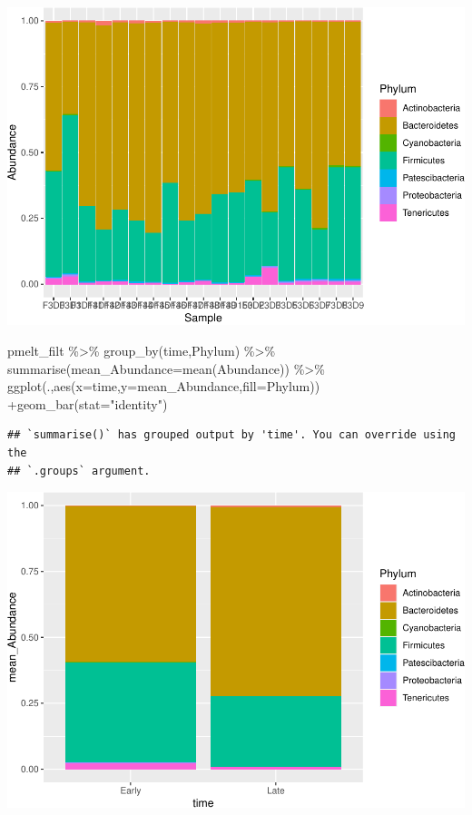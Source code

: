 \documentclass[
]{book}
\newenvironment{Shaded}{\begin{snugshade}}{\end{snugshade}}
\newcommand{\AttributeTok}[1]{\textcolor[rgb]{0.77,0.63,0.00}{#1}}
\newcommand{\FunctionTok}[1]{\textcolor[rgb]{0.00,0.00,0.00}{#1}}
\newcommand{\NormalTok}[1]{#1}
\newcommand{\SpecialCharTok}[1]{\textcolor[rgb]{0.00,0.00,0.00}{#1}}
\newcommand{\StringTok}[1]{\textcolor[rgb]{0.31,0.60,0.02}{#1}}
\begin{document}
\includegraphics{16sworkshop_files/figure-latex/unnamed-chunk-2-1.pdf}

\begin{Shaded}
\begin{Highlighting}[]
\NormalTok{pmelt\_filt }\SpecialCharTok{\%\textgreater{}\%} \FunctionTok{group\_by}\NormalTok{(time,Phylum) }\SpecialCharTok{\%\textgreater{}\%} \FunctionTok{summarise}\NormalTok{(}\AttributeTok{mean\_Abundance=}\FunctionTok{mean}\NormalTok{(Abundance)) }\SpecialCharTok{\%\textgreater{}\%} \FunctionTok{ggplot}\NormalTok{(.,}\FunctionTok{aes}\NormalTok{(}\AttributeTok{x=}\NormalTok{time,}\AttributeTok{y=}\NormalTok{mean\_Abundance,}\AttributeTok{fill=}\NormalTok{Phylum)) }\SpecialCharTok{+}\FunctionTok{geom\_bar}\NormalTok{(}\AttributeTok{stat=}\StringTok{"identity"}\NormalTok{)}
\end{Highlighting}
\end{Shaded}

\begin{verbatim}
## `summarise()` has grouped output by 'time'. You can override using the
## `.groups` argument.
\end{verbatim}

\includegraphics{16sworkshop_files/figure-latex/unnamed-chunk-2-2.pdf}
\end{document}
